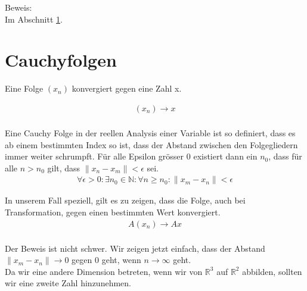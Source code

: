 \documentclass[a4paper]{article}
\begin{document}
Beweis:\\

Im Abschnitt \ref{Cauchy_Folgen}.

\section{Cauchyfolgen}
\label{Cauchy_Folgen}

Eine Folge $(x_n)$ konvergiert gegen eine Zahl x.

\begin{displaymath}
\begin{align}
    (x_n) \rightarrow x\\
\end{align}
\end{displaymath}
    

Eine Cauchy Folge in der reellen Analysis einer Variable ist so definiert, dass es ab einem bestimmten Index so ist, dass der Abstand zwischen den Folgegliedern immer weiter schrumpft. F\"ur alle Epsilon gr\"osser $0$ existiert dann ein $n_0$, dass f\"ur alle $n > n_0$ gilt, dass $\|x_n - x_m\| < \epsilon$ sei.\\


\begin{displaymath}
\begin{align}
\forall \epsilon > 0 : \exists n_{0} \in \mathbb{N} : \forall n \geq n_{0} : \|x_{m}-x_{n}\| < \epsilon
\end{align}
\end{displaymath}


In unserem Fall speziell, gilt es zu zeigen, dass die Folge, auch bei Transformation, gegen einen bestimmten Wert konvergiert.\\

\begin{displaymath}
\begin{align}
    A(x_n) \rightarrow Ax\\
\end{align}
\end{displaymath}


Der Beweis ist nicht schwer. Wir zeigen jetzt einfach, dass der Abstand $\|x_m - x_n\| \rightarrow 0$ gegen $0$ geht, wenn $n\rightarrow \infty$ geht.\\

Da wir eine andere Dimension betreten, wenn wir von $\mathbb{R}^{3}$ auf $\mathbb{R}^{2}$ abbilden, sollten wir eine zweite Zahl 
hinzunehmen.\\
\end{document}
